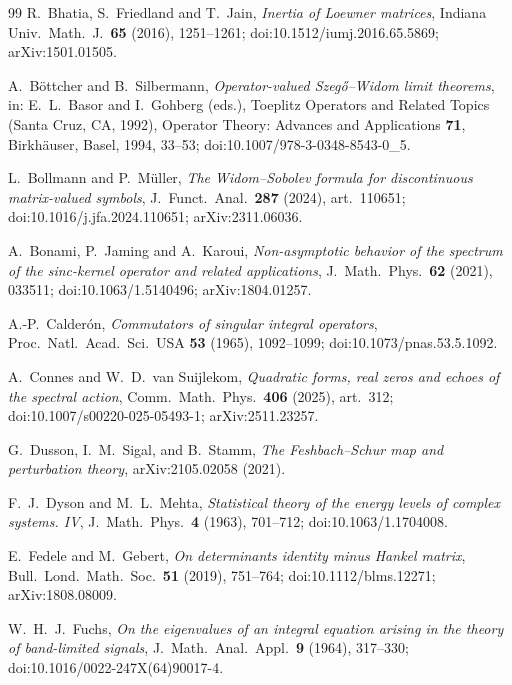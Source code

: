 \begin{thebibliography}{99}
 R.~Bhatia, S.~Friedland and T.~Jain,
\emph{Inertia of Loewner matrices}, Indiana Univ.\ Math.\ J.\ \textbf{65} (2016),
1251--1261; doi:10.1512/iumj.2016.65.5869; arXiv:1501.01505.

 A.~B\"ottcher and B.~Silbermann,
\emph{Operator-valued Szeg\H{o}--Widom limit theorems}, in:
E.~L.~Basor and I.~Gohberg (eds.), Toeplitz Operators and Related Topics
(Santa Cruz, CA, 1992), Operator Theory: Advances and Applications \textbf{71},
Birkh\"auser, Basel, 1994, 33--53; doi:10.1007/978-3-0348-8543-0\_5.

 L.~Bollmann and P.~M\"uller,
\emph{The Widom--Sobolev formula for discontinuous matrix-valued symbols},
J.\ Funct.\ Anal.\ \textbf{287} (2024), art.~110651;
doi:10.1016/j.jfa.2024.110651; arXiv:2311.06036.

 A.~Bonami, P.~Jaming and A.~Karoui,
\emph{Non-asymptotic behavior of the spectrum of the sinc-kernel operator and
related applications}, J.\ Math.\ Phys.\ \textbf{62} (2021), 033511;
doi:10.1063/1.5140496; arXiv:1804.01257.

 A.-P.~Calder\'on, \emph{Commutators of singular integral
operators}, Proc.\ Natl.\ Acad.\ Sci.\ USA \textbf{53} (1965), 1092--1099;
doi:10.1073/pnas.53.5.1092.

 A.~Connes and W.~D.~van Suijlekom, \emph{Quadratic forms, real
zeros and echoes of the spectral action}, Comm.\ Math.\ Phys.\ \textbf{406} (2025),
art.\ 312; doi:10.1007/s00220-025-05493-1; arXiv:2511.23257.

G.~Dusson, I.~M.~Sigal, and B.~Stamm,
\emph{The Feshbach--Schur map and perturbation theory},
arXiv:2105.02058 (2021).

 F.~J.~Dyson and M.~L.~Mehta, \emph{Statistical theory
of the energy levels of complex systems. IV}, J.\ Math.\ Phys.\ \textbf{4} (1963),
701--712; doi:10.1063/1.1704008.

 E.~Fedele and M.~Gebert,
\emph{On determinants identity minus Hankel matrix}, Bull.\ Lond.\ Math.\
Soc.\ \textbf{51} (2019), 751--764; doi:10.1112/blms.12271; arXiv:1808.08009.

 W.~H.~J.~Fuchs, \emph{On the eigenvalues of an integral equation
arising in the theory of band-limited signals}, J.\ Math.\ Anal.\ Appl.\ \textbf{9}
(1964), 317--330; doi:10.1016/0022-247X(64)90017-4.


\end{thebibliography}
